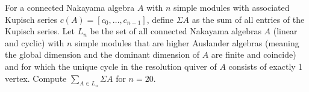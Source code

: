 For a connected Nakayama algebra $A$ with $n$ simple modules with associated Kupisch series $c(A)=[c_0,\dots,c_{n-1}]$, define $\Sigma A$ as the sum of all entries of the Kupisch series. Let $L_n$ be the set of all connected Nakayama algebras $A$ (linear and cyclic) with $n$ simple modules that are higher Auslander algebras (meaning the global dimension and the dominant dimension of $A$ are finite and coincide) and for which the unique cycle in the resolution quiver of $A$ consists of exactly 1 vertex. Compute $\sum_{A \in L_n}\Sigma A$ for $n=20$.
